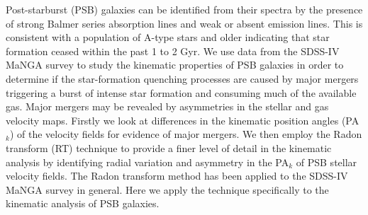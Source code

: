 
Post-starburst (PSB) galaxies can be identified from their spectra by the presence of strong Balmer series absorption lines and weak or absent emission lines. This is consistent with a population of A-type stars and older indicating that star formation ceased within the past 1 to 2 Gyr. We use data from the SDSS-IV MaNGA survey to study the kinematic properties of PSB galaxies in order to determine if the star-formation quenching processes are caused by major mergers triggering a burst of intense star formation and consuming much of the available gas. Major mergers may be revealed by asymmetries in the stellar and gas velocity maps. Firstly we look at differences in the kinematic position angles (PA$_{k}$) of the velocity fields for evidence of major mergers. We then employ the Radon transform (RT) technique to provide a finer level of detail in the kinematic analysis by identifying radial variation and asymmetry in the PA$_{k}$ of PSB stellar velocity fields. The Radon transform method has been applied to the SDSS-IV MaNGA survey in general. Here we apply the technique specifically to the kinematic analysis of PSB galaxies.    


